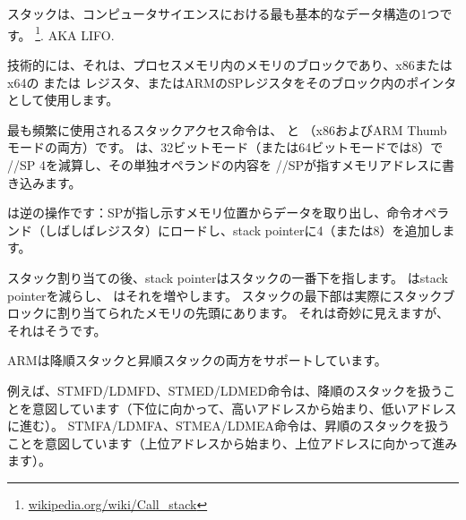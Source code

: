 \section{\Stack}
\label{sec:stack}
\myindex{\Stack}

スタックは、コンピュータサイエンスにおける最も基本的なデータ構造の1つです。
\footnote{\href{http://go.yurichev.com/17119}{wikipedia.org/wiki/Call\_stack}}.
\ac{AKA} \ac{LIFO}.

技術的には、それは、プロセスメモリ内のメモリのブロックであり、x86またはx64の \ESP または \RSP レジスタ、またはARMの\ac{SP}レジスタをそのブロック内のポインタとして使用します。

最も頻繁に使用されるスタックアクセス命令は、 \PUSH と \POP （x86およびARM Thumbモードの両方）です。 
\PUSH は、32ビットモード（または64ビットモードでは8）で \ESP/\RSP/\ac{SP} 4を減算し、その単独オペランドの内容を \ESP/\RSP/\ac{SP}が指すメモリアドレスに書き込みます。

\POP は逆の操作です：\ac{SP}が指し示すメモリ位置からデータを取り出し、命令オペランド（しばしばレジスタ）にロードし、\gls{stack pointer}に4（または8）を追加します。

スタック割り当ての後、\gls{stack pointer}はスタックの一番下を指します。 \PUSH は\gls{stack pointer}を減らし、 \POP はそれを増やします。 
スタックの最下部は実際にスタックブロックに割り当てられたメモリの先頭にあります。 それは奇妙に見えますが、それはそうです。

ARMは降順スタックと昇順スタックの両方をサポートしています。


例えば、\ac{STMFD}/\ac{LDMFD}、\ac{STMED}/\ac{LDMED}命令は、降順のスタックを扱うことを意図しています（下位に向かって、高いアドレスから始まり、低いアドレスに進む）。 \ac{STMFA}/\ac{LDMFA}、\ac{STMEA}/\ac{LDMEA}命令は、昇順のスタックを扱うことを意図しています（上位アドレスから始まり、上位アドレスに向かって進みます）。


